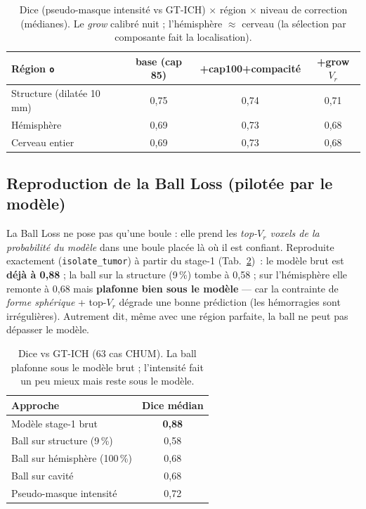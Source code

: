 \documentclass[11pt,a4paper]{article}
\begin{document}
\begin{table}[h]\centering
\caption{Dice (pseudo-masque intensité vs GT-ICH) $\times$ région $\times$ niveau de
correction (médianes). Le \emph{grow} calibré nuit ; l'hémisphère $\approx$ cerveau
(la sélection par composante fait la localisation).}
\label{tab:pseudo}
\begin{tabular}{lccc}
\toprule
Région \texttt{o} & base (cap 85) & +cap100+compacité & +grow $V_r$ \\
\midrule
Structure (dilatée 10\,mm) & 0,75 & 0,74 & 0,71 \\
Hémisphère & 0,69 & 0,73 & 0,68 \\
Cerveau entier & 0,69 & 0,73 & 0,68 \\
\bottomrule
\end{tabular}
\end{table}

\subsection{Reproduction de la Ball Loss (pilotée par le modèle)}
La Ball Loss ne pose pas qu'une boule : elle prend les \emph{top-$V_r$ voxels de la
probabilité du modèle} dans une boule placée là où il est confiant. Reproduite exactement
(\texttt{isolate\_tumor}) à partir du stage-1 (Tab.~\ref{tab:ball})~: le modèle brut est
\textbf{déjà à 0,88} ; la ball sur la structure (9\,\%) tombe à 0,58 ; sur l'hémisphère
elle remonte à 0,68 mais \textbf{plafonne bien sous le modèle} --- car la contrainte de
\emph{forme sphérique} + top-$V_r$ dégrade une bonne prédiction (les hémorragies sont
irrégulières). Autrement dit, même avec une région parfaite, la ball ne peut pas dépasser
le modèle.

\begin{table}[h]\centering
\caption{Dice vs GT-ICH (63 cas CHUM). La ball plafonne sous le modèle brut ;
l'intensité fait un peu mieux mais reste sous le modèle.}
\label{tab:ball}
\begin{tabular}{lc}
\toprule
Approche & Dice médian \\
\midrule
Modèle stage-1 brut & \textbf{0,88} \\
Ball sur structure (9\,\%) & 0,58 \\
Ball sur hémisphère (100\,\%) & 0,68 \\
Ball sur cavité & 0,68 \\
Pseudo-masque intensité & 0,72 \\
\bottomrule
\end{tabular}
\end{table}
\end{document}

